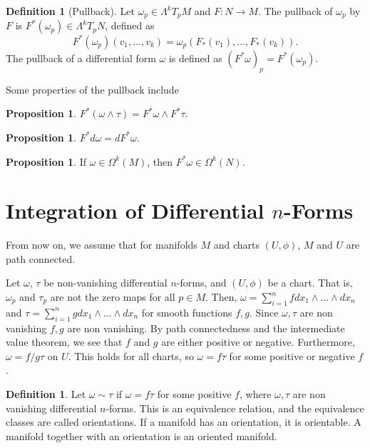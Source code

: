 \documentclass[]{article}
\theoremstyle{definition}
\theoremstyle{definition}
\newtheorem{definition}[theorem]{Definition} %
\newtheorem{proposition}[theorem]{Proposition}
\begin{document}
\begin{definition}[Pullback]
    Let $\omega_p\in \Lambda^kT_pM$ and $F:N \rightarrow  M$. The pullback of $\omega_p$ by $F$ is $F^*(\omega_p)\in \Lambda^kT_pN$, defined as \[F^*(\omega_p)(v_1,\dots,v_k)=\omega_p(F_*(v_1),\dots, F_*(v_k)).\]
    The pullback of a differential form $\omega$ is defined as $(F^*\omega)_p=F^*(\omega_p)$.
\end{definition}

Some properties of the pullback include

\begin{proposition}
    $F^*(\omega\wedge\tau)=F^*\omega\wedge F^*\tau$.
\end{proposition}

\begin{proposition}
    $F^*d\omega=dF^*\omega$.
\end{proposition}

\begin{proposition}
    If $\omega\in \Omega^k(M)$, then $F^*\omega\in \Omega^k(N)$.
\end{proposition}

\section{Integration of Differential $n$-Forms}
From now on, we assume that for manifolds $M$ and charts $(U, \phi)$, $M$ and $U$ are path connected.

Let $\omega$, $\tau$ be non-vanishing differential $n$-forms, and $(U, \phi)$ be a chart. That is, $\omega_p$ and $\tau_p$ are not the zero maps for all $p\in M$. Then, $\omega=\sum_{i=1}^{n}f dx_1\wedge\dots\wedge dx_n$ and $\tau=\sum_{i=1}^{n}g dx_1\wedge\dots\wedge dx_n$ for smooth functions $f, g$. Since $\omega, \tau$ are non vanishing $f, g$ are non vanishing. By path connectedness and the intermediate value theorem, we see that $f$ and $g$ are either positive or negative. Furthermore, $\omega=f/g\tau$ on $U$. This holds for all charts, so $\omega=f\tau$ for some positive or negative $f$.
\begin{definition}
    Let $\omega\sim \tau$ if $\omega=f\tau$ for some positive $f$, where $\omega, \tau$ are non vanishing differential $n$-forms. This is an equivalence relation, and the equivalence classes are called orientations. If a manifold has an orientation, it is orientable. A manifold together with an orientation is an oriented manifold.
\end{definition}
\end{document}
